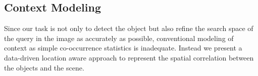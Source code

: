 %
%
%
%




\subsection{Context Modeling}
\label{sec:context}
Since our task is not only to detect the object but also refine the search space of the query in the image as accurately as possible, conventional modeling of context as simple co-occurrence statistics is inadequate. Instead we present a data-driven location aware approach to represent the spatial correlation between the objects and the scene. 

